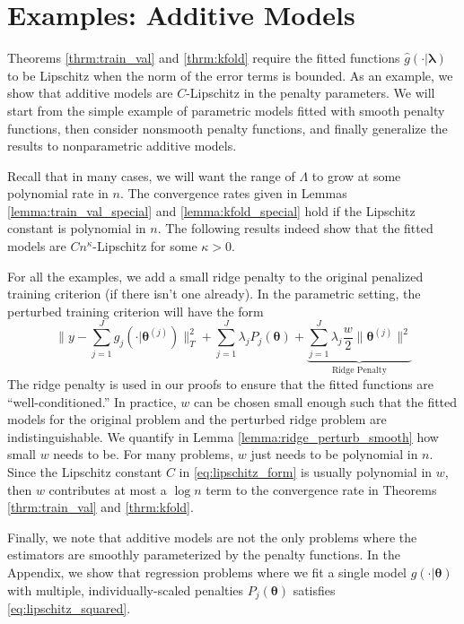 \documentclass[12pt]{article}
\begin{document}
\section{Examples: Additive Models}
\label{sec:examples}

Theorems \ref{thrm:train_val} and \ref{thrm:kfold} require the fitted functions $\hat{g}(\cdot | \boldsymbol{\lambda})$ to be Lipschitz when the norm of the error terms is bounded. As an example, we show that additive models are $C$-Lipschitz in the penalty parameters. We will start from the simple example of parametric models fitted with smooth penalty functions, then consider nonsmooth penalty functions, and finally generalize the results to nonparametric additive models. 

Recall that in many cases, we will want the range of $\Lambda$ to grow at some polynomial rate in $n$. The convergence rates given in Lemmas \ref{lemma:train_val_special} and \ref{lemma:kfold_special} hold if the Lipschitz constant is polynomial in $n$. The following results indeed show that the fitted models are $Cn^\kappa$-Lipschitz for some $\kappa > 0$.

For all the examples, we add a small ridge penalty to the original penalized training criterion (if there isn't one already). In the parametric setting, the perturbed training criterion will have the form
\begin{equation}
\label{eq:lipschitz_form}
\| y - \sum_{j=1}^J g_j(\cdot | \boldsymbol{\theta}^{(j)}) \|_T^2
+ \sum_{j=1}^J 
\lambda_j 
P_j(\boldsymbol{\theta})
+ 
\underbrace{\sum_{j=1}^J  \lambda_j  \frac{w}{2} \| \boldsymbol{\theta}^{(j)} \|^2}_{\text{Ridge Penalty}}
\end{equation}
The ridge penalty is used in our proofs to ensure that the fitted functions are ``well-conditioned.''
In practice, $w$ can be chosen small enough such that the fitted models for the original problem and the perturbed ridge problem are indistinguishable. We quantify in Lemma \ref{lemma:ridge_perturb_smooth} how small $w$ needs to be. For many problems, $w$ just needs to be polynomial in $n$. Since the Lipschitz constant $C$ in \eqref{eq:lipschitz_form} is usually polynomial in $w$, then $w$ contributes at most a $\log n$ term to the convergence rate in Theorems \ref{thrm:train_val} and \ref{thrm:kfold}.

Finally, we note that additive models are not the only problems where the estimators are smoothly parameterized by the penalty functions. In the Appendix, we show that regression problems where we fit a single model $g(\cdot | \boldsymbol{\theta})$ with multiple, individually-scaled penalties $P_j(\boldsymbol{\theta})$ satisfies \eqref{eq:lipschitz_squared}.
\end{document}
